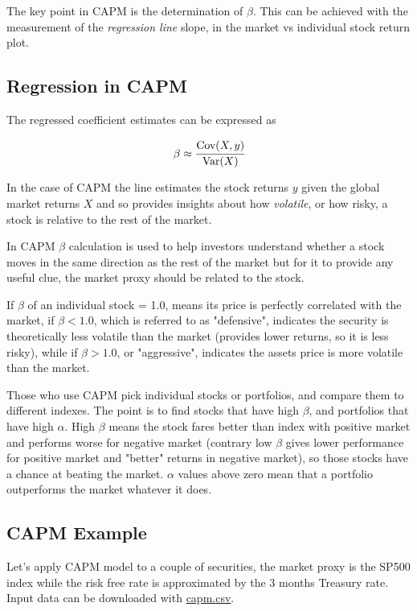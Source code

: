 The key point in CAPM is the determination of $\beta$. This can be achieved with the measurement of the \emph{regression line} slope, in the market vs individual stock return plot.

\subsection{Regression in CAPM}

The regressed coefficient estimates can be expressed as

\begin{equation}
\beta \approx \cfrac{\text{Cov}(X,y)}{\text{Var}(X)}
\end{equation}

In the case of CAPM the line estimates the stock returns $y$ given the global market returns $X$ and so provides insights about how \emph{volatile}, or how risky, a stock is relative to the rest of the market.

In CAPM $\beta$ calculation is used to help investors understand whether a stock moves in the same direction as the rest of the market but for it to provide any useful clue, the market proxy should be related to the stock.

If $\beta$ of an individual stock = 1.0, means its price is perfectly correlated with the market, if $\beta < 1.0$, which is referred to as "defensive", indicates the security is theoretically less volatile than the market (provides lower returns, so it is less risky), while if $\beta > 1.0$, or "aggressive", indicates the assets price is more volatile than the market.

Those who use CAPM pick individual stocks or portfolios, and compare them to different indexes. The point is to find stocks that have high $\beta$, and portfolios that have high $\alpha$. High $\beta$ means the stock fares better than index with positive market and performs worse for negative market (contrary low $\beta$ gives lower performance for positive market and "better" returns in negative market), so those stocks have a chance at beating the market. $\alpha$ values above zero mean that a portfolio outperforms the market whatever it does.

\subsection{CAPM Example}
\label{sec:linear_regression}

Let's apply CAPM model to a couple of securities, the market proxy is the SP500 index while the risk free rate is approximated by the 3 months Treasury rate.
Input data can be downloaded with \href{https://raw.githubusercontent.com/matteosan1/finance_course/develop/libro/input_files/capm.csv}{capm.csv}.

